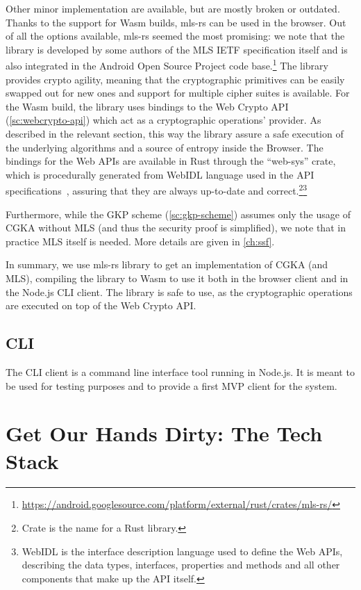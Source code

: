 Other minor implementation are available, but are mostly broken or outdated.
Thanks to the support for Wasm builds, mls-rs can be used in the browser.
Out of all the options available, mls-rs seemed the most promising:
we note that the library is developed by some authors of the MLS IETF
specification itself and is also integrated in the Android Open Source Project
code base.\footnote{\url{https://android.googlesource.com/platform/external/rust/crates/mls-rs/}}
The library provides crypto agility, meaning that the cryptographic
primitives can be easily swapped out for new ones and support for multiple cipher suites is available.
For the Wasm build, the library uses bindings to the Web Crypto API 
(\cref{sc:webcrypto-api}) which act as a cryptographic operations' provider.
As described in the relevant section, 
this way the library assure a safe execution of the underlying
algorithms and a source of entropy inside the Browser. 
The bindings for the Web APIs are available in Rust 
through the ``web-sys'' crate,
which is procedurally generated from WebIDL language
used in the API specifications~\cite{WebSys}, assuring
that they are always up-to-date and correct.\footnote{Crate is the name for a Rust library.}\footnote{WebIDL is the interface description language used to define the Web APIs, describing the data types, interfaces, properties and methods and all other components that make up the API itself.} 

Furthermore, while the GKP scheme (\cref{sc:gkp-scheme})
assumes only the usage of CGKA without MLS (and thus the security proof
is simplified), we note that in practice MLS itself is needed.
More details are given in \cref{ch:ssf}.

In summary, we use mls-rs library to get an implementation
of CGKA (and MLS), compiling the library to Wasm to use it both
in the browser client and in the Node.js CLI client. The library is
safe to use, as the cryptographic operations are executed on top of the Web Crypto API.


\subsection{CLI}\label{CLI}

The CLI client is a command line interface tool running in Node.js.
It is meant to be used for testing purposes and to provide a
first MVP client for the system.




\section{Get Our Hands Dirty: The Tech Stack}

